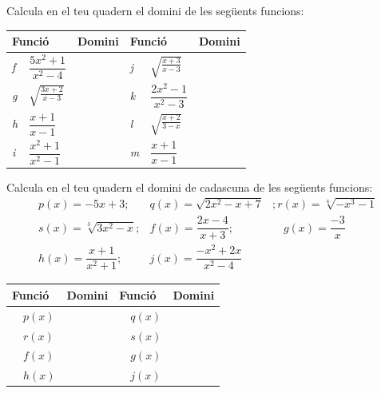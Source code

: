 \begin{mylist} 
	
	
	\exer[1]  Calcula en el teu quadern el domini de les següents funcions:
	
	
	\begin{tabular}{|p{0.2in}|p{0.9in}|p{1.3in}|p{0.2in}|p{0.8in}|p{1.4in}|} \hline 
		\multicolumn{2}{|p{1in}|}{\textbf{Funció}} & \textbf{Domini} & \multicolumn{2}{|p{1.0in}|}{\textbf{Funció}} & \textbf{Domini} \\ \hline 
		\textit{f} & $\dfrac{5x^{2} +1}{x^{2} -4} $ &  &  \textit{j} & $\sqrt{\frac{x+3}{x-3} } $ &  \\ \hline 
		\textit{g} & $\sqrt{\frac{3x+2}{x-3} } $ &  &  \textit{k} & $\dfrac{2x^{2} -1}{x^{2} -3} $ &  \\ \hline 
		\textit{h} & $\dfrac{x+1}{x-1} $ &  &  \textit{l} & $\sqrt{\frac{x+2}{3-x} } $ &  \\ \hline 
		\textit{i} & $\dfrac{x^{2} +1}{x^{2} -1} $ &  &  \textit{m} & $\dfrac{x+1}{x-1} $ &  \\ \hline 
	\end{tabular}
\answers{$\text{Dom }f=\Re-\{\pm 2\}$,\par $\text{Dom } g=(-\infty,-2/3]\cup (3,+\infty)$,\par $\text{Dom } h=\Re-\{1\}$,\par $\text{Dom } i=\Re-\{\pm 1\}$,\par $\text{Dom } j=(-\infty,-3]\cup(3,+\infty)$,\par $\text{Dom } k=\Re-\{\pm \sqrt{3}\}$,\par $\text{Dom } l=[-2,3)$, $\text{Dom } m=\Re - \{1\}$}
	
\exer Calcula en el teu quadern el domini de cadascuna de les següents funcions:
\[\begin{array}{lll} 
p(x)=-5x+3;&q(x)=\sqrt{2x^{2} -x+7}&;r(x)=\sqrt[{4}]{-x^{3} -1} \\ s(x)=\sqrt[{3}]{3x^{2} -x};&f(x)=\dfrac{2x-4}{x+3};&\quad g(x)=\dfrac{-3}{x} \\ 
h(x)=\dfrac{x+1}{x^{2} +1};& j(x)=\dfrac{-x^{2} +2x}{x^{2} -4}& \end{array}\] 
 
\begin{tabular}{|p{0.2in} p{0.6in}|p{1.5in}|p{0.3in} p{0.6in} | p{1.6in}|} \hline 
\multicolumn{2}{|p{1in}|}{Funció} & Domini & \multicolumn{2}{|p{0.9in}|}{Funció} & Domini \\ \hline 
\textit{} & $p(x)$ &  &  \textit{} & $q(x)$ &  \\ \hline 
\textit{} & $r(x)$ &  &  \textit{} & $s(x)$ &  \\ \hline 
\textit{} & $f(x)$ &  &  \textit{} & $g(x)$ &  \\ \hline 
\textit{} & $h(x)$ &  &  \textit{} & $j(x)$ &  \\ \hline 
\end{tabular}


\end{mylist}

